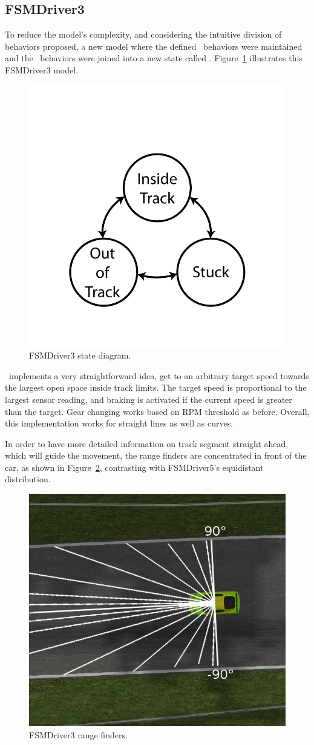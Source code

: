 \subsection{FSMDriver3}%
To reduce the model's complexity, and considering the intuitive division of behaviors proposed, a new model where the defined \recovery~behaviors were maintained and the \racing~behaviors were joined into a new state called \IT. Figure~\ref{Fig:FSM3Diagram} illustrates this FSMDriver3 model.

\begin{figure}[h]
	\centering
	\includegraphics[width=.4\textwidth]{img/ThreeStateFSM}
	\caption{FSMDriver3 state diagram.}
	\label{Fig:FSM3Diagram}
\end{figure}

\IT~implements a very straightforward idea, get to an arbitrary target speed towards the largest open space inside track limits. The target speed is proportional to the largest sensor reading, and braking is activated if the current speed is greater than the target. Gear changing works based on RPM threshold as before. Overall, this implementation works for straight lines as well as curves.

In order to have more detailed information on track segment straight ahead, which will guide the movement, the range finders are concentrated in front of the car, as shown in Figure~\ref{Fig:FSM3Sensors}, contrasting with FSMDriver5's equidistant distribution.

\begin{figure}[h]
	\centering
	\includegraphics[width=.45\textwidth]{img/FSM3Sensors}
	\caption{FSMDriver3 range finders.}
	\label{Fig:FSM3Sensors}
\end{figure}

